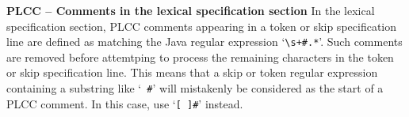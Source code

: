 \begin{minipage}[t]{\sw}
\slidenumber
\LARGE
{\bf PLCC -- Comments in the lexical specification section}\exx
In the lexical specification section,
PLCC comments appearing in a token or skip specification line
are defined as matching the Java regular expression `\verb'\s+#.*''.
Such comments are removed before attemtping
to process the remaining characters
in the token or skip specification line.
This means that a skip or token regular expression
containing a substring like `\verb' #''
will mistakenly be considered as the start of a PLCC comment.
In this case, use `\verb'[ ]#'' instead.
\end{minipage}
\clearpage
